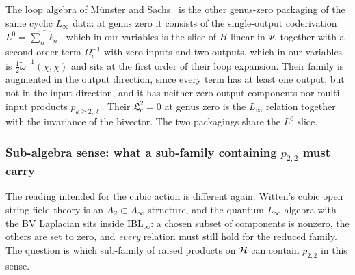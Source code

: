 The loop algebra of M\"unster and Sachs~\cite{Muenster:2014:HomotopyClassificationBosonic} is the other genus-zero packaging of the same cyclic $L_\infty$ data: at genus zero it consists of the single-output coderivation $L^0=\widehat{\sum_n\ell_n}$, which in our variables is the slice of $H$ linear in $\Psi$, together with a second-order term $\Omega_c^{-1}$ with zero inputs and two outputs, which in our variables is $\frac12\tilde\omega^{-1}(\chi,\chi)$ and sits at the first order of their loop expansion. Their family is augmented in the output direction, since every term has at least one output, but not in the input direction, and it has neither zero-output components nor multi-input products $p_{k\ge2,\ell}$. Their $\mathfrak L_c^2=0$ at genus zero is the $L_\infty$ relation together with the invariance of the bivector. The two packagings share the $L^0$ slice.

\subsubsection{Sub-algebra sense: what a sub-family containing \texorpdfstring{$p_{2,2}$}{p22} must carry}
\label{ibk:sec:senses:sub}

The reading intended for the cubic action is different again. Witten's cubic open string field theory is an $A_2\subset A_\infty$ structure, and the quantum $L_\infty$ algebra with the BV Laplacian sits inside IBL$_\infty$: a chosen subset of components is nonzero, the others are set to zero, and \emph{every} relation must still hold for the reduced family. The question is which sub-family of raised products on ${\mathcal{H}}$ can contain $p_{2,2}$ in this sense.

